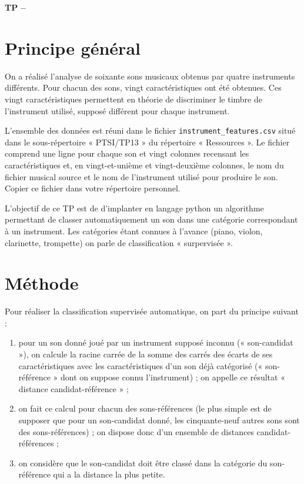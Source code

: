 

%



\begin{center}
{\Large\bf TP \no {\num} -- \descrip}
\end{center}
 
\section{Principe général}

On a réalisé l'analyse de soixante sons musicaux obtenus par quatre instruments différents. Pour chacun des sons, vingt caractéristiques ont été obtenues. Ces vingt caractéristiques permettent en théorie de discriminer le timbre de l'instrument utilisé, supposé différent pour chaque instrument.

L'ensemble des données est réuni dans le fichier \verb|instrument_features.csv| situé dans le sous-répertoire « PTSI/TP13 » du répertoire « Ressources ». Le fichier comprend une ligne pour chaque son et vingt colonnes recensant les caractéristiques et, en vingt-et-unième et vingt-deuxième colonnes, le nom du fichier musical source et le nom de l'instrument utilisé pour produire le son. Copier ce fichier dans votre répertoire personnel.

L'objectif de ce TP est de d'implanter en langage python un algorithme permettant de classer automatiquement un son dans une catégorie correspondant à un instrument. Les catégories étant connues à l'avance (piano, violon, clarinette, trompette) on parle de classification « surpervisée ».

\section{Méthode}

Pour réaliser la classification supervisée automatique, on part du principe suivant : \begin{enumerate}
\item pour un son donné joué par un instrument supposé inconnu (« son-candidat »), on calcule la racine carrée de la somme des carrés des écarts de ses caractéristiques avec les caractéristiques d'un son déjà catégorisé (« son-référence » dont on suppose connu l'instrument) ; on appelle ce résultat « distance candidat-référence » ; 
\item on fait ce calcul pour chacun des sons-références (le plus simple est de supposer que pour un son-candidat donné, les cinquante-neuf autres sons sont des sons-références) ; on dispose donc d'un ensemble de distances candidat-références ;
\item on considère que le son-candidat doit être classé dans la catégorie du son-référence qui a la distance la plus petite.                                                                                                                                                                                                                                                                                                                                                                                                        \end{enumerate}

